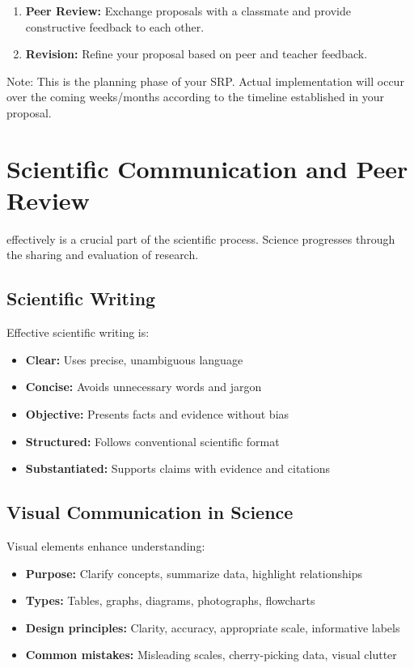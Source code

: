 \documentclass[justified,notoc]{tufte-book}
\newenvironment{investigation}[1]{%
    \begin{tcolorbox}[colback=info!10,colframe=info,title=\textbf{Investigation: #1}]
}{%
    \end{tcolorbox}
}
\begin{document}
\begin{investigation}{Planning Your Student Research Project}
\begin{enumerate}
    \item \textbf{Peer Review:} Exchange proposals with a classmate and provide constructive feedback to each other.
    
    \item \textbf{Revision:} Refine your proposal based on peer and teacher feedback.
\end{enumerate}

Note: This is the planning phase of your SRP. Actual implementation will occur over the coming weeks/months according to the timeline established in your proposal.
\end{investigation}

\section{Scientific Communication and Peer Review}

 effectively is a crucial part of the scientific process. Science progresses through the sharing and evaluation of research.

\subsection{Scientific Writing}

Effective scientific writing is:
\begin{itemize}
    \item \textbf{Clear:} Uses precise, unambiguous language
    \item \textbf{Concise:} Avoids unnecessary words and jargon
    \item \textbf{Objective:} Presents facts and evidence without bias
    \item \textbf{Structured:} Follows conventional scientific format
    \item \textbf{Substantiated:} Supports claims with evidence and citations
\end{itemize}

\subsection{Visual Communication in Science}

Visual elements enhance understanding:
\begin{itemize}
    \item \textbf{Purpose:} Clarify concepts, summarize data, highlight relationships
    \item \textbf{Types:} Tables, graphs, diagrams, photographs, flowcharts
    \item \textbf{Design principles:} Clarity, accuracy, appropriate scale, informative labels
    \item \textbf{Common mistakes:} Misleading scales, cherry-picking data, visual clutter
\end{itemize}
\end{document}
